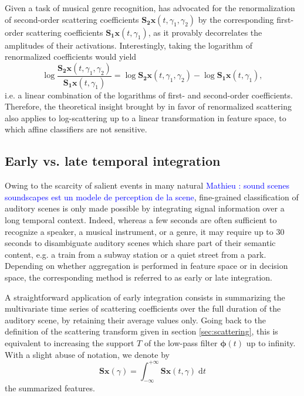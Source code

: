 \documentclass[journal]{IEEEtran}
\makeatletter
\newcommand*{\eg}{e.g.\@\xspace}
\newcommand*{\ie}{i.e.\@\xspace}
\newcommand{\ml}[1]{\textcolor{blue}{ Mathieu : #1}}
\makeatother
\begin{document}
Given a task of musical genre recognition, \cite{Anden2014} has advocated for the renormalization of second-order scattering coefficients $\mathbf{S_2}\boldsymbol{x}(t,\gamma_1,\gamma_2)$ by the corresponding first-order scattering coefficients $\mathbf{S_1}\boldsymbol{x}(t,\gamma_1)$, as it provably decorrelates the amplitudes of their activations.
Interestingly, taking the logarithm of renormalized coefficients would yield
\begin{equation}
\log \dfrac{\mathbf{S_2}\boldsymbol{x}(t,\gamma_1,\gamma_2)}{\mathbf{S_1}\boldsymbol{x}(t,\gamma_1)} =
\log \mathbf{S_2}\boldsymbol{x}(t, \gamma_1, \gamma_2) -
\log \mathbf{S_1}\boldsymbol{x}(t, \gamma_1),
\end{equation}
\ie a linear combination of the logarithms of first- and second-order coefficients.
Therefore, the theoretical insight brought by \cite{Anden2014} in favor of renormalized scattering also applies to log-scattering up to a linear transformation in feature space, to which affine classifiers are not sensitive.

\subsection{Early vs. late temporal integration}
Owing to the scarcity of salient events in many natural \ml{sound scenes soundscapes est un modele de perception de la scene}, fine-grained classification of auditory scenes is only made
possible by integrating signal information over a long temporal context.
Indeed, whereas a few seconds are often sufficient to recognize a speaker,
a musical instrument, or a genre, it may require up to 30 seconds
to disambiguate auditory scenes which share part of their semantic content, \eg a train from a subway station or a quiet street from a park.
Depending on whether aggregation is performed in feature space or in decision space, the corresponding method is referred to as early or late integration.

A straightforward application of early integration consists in summarizing the multivariate time series of scattering coefficients over the full duration of the auditory scene, by retaining their average values only.
Going back to the definition of the scattering transform given in section \ref{sec:scattering}, this is equivalent to increasing the support $T$ of the low-pass filter $\boldsymbol{\phi}(t)$ up to infinity. With a slight abuse of notation, we denote by
\begin{equation}
\mathbf{S}\boldsymbol{x}(\gamma) =
\int_{-\infty}^{+\infty} \mathbf{S}\boldsymbol{x}(t,\gamma)\;\mathrm{d}t
\end{equation}
the summarized features.
\end{document}
